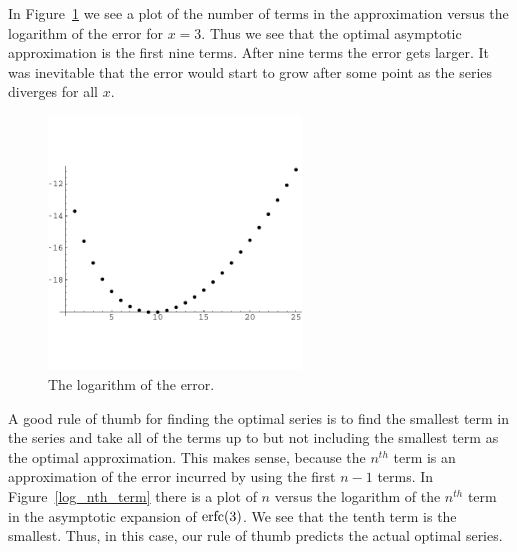 \begin{Example}
  In Figure~\ref{optimal} we see a plot of the number of terms in the
  approximation versus the logarithm of the error for $x = 3$.  Thus 
  we see that the optimal asymptotic approximation is the
  first nine terms.  After nine terms the error gets larger.  It was
  inevitable that the error would start to grow after some point as the
  series diverges for all $x$.


  \begin{figure}[h!]
    \begin{center}
      \includegraphics[width=0.6\textwidth]{ode/asymptotic/optimal}
    \end{center}
    \caption{The logarithm of the error.}
    \label{optimal}
  \end{figure}




  A good rule of thumb for finding the optimal series is to find the
  smallest term in the series and take all of the terms up to but not
  including the smallest term as the optimal approximation.  This
  makes sense, because the $n^{t h}$ term is an approximation of the
  error incurred by using the first $n-1$ terms.
  In Figure~\ref{log_nth_term} there is a plot of $n$ versus the
  logarithm of the $n^{t h}$ term in the asymptotic expansion of
  $\mathop{\mathrm{erfc}}\nolimits(3)$.  We see that the tenth term is the smallest.
  Thus, in this case, our rule of thumb predicts the actual optimal series.





\end{Example}
